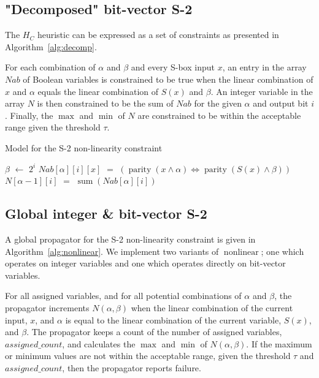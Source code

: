 \documentclass[a4paper,10pt,twoside,openright]{book}
\newcommand{\N}{N(\alpha,\beta)}
\newcommand*\Let[2]{\State #1 $\gets$ #2}
\newcommand*\Equivalent[2]{\State #1 $=$ #2}
\DeclareMathOperator{\parity}{parity}
\DeclareMathOperator{\funcsum}{sum}
\DeclareMathOperator{\nonlinear}{nonlinear}
\begin{document}
\subsection{"Decomposed" bit-vector S-2}
The $H_C$ heuristic can be expressed as a set of constraints as presented in Algorithm~\ref{alg:decomp}. 

For each combination of $\alpha$ and $\beta$
and every S-box input $x$,
an entry in the array $\mathit{Nab}$ of Boolean variables is constrained
to be true when the linear combination of $x$ and $\alpha$
equals the linear combination of $S(x)$ and $\beta$.
An integer variable in the array $N$ is then constrained to be the 
sum of $\mathit{Nab}$ for the given $\alpha$ and output bit $i$.
Finally, the $\max$ and $\min$ of $N$ are constrained to be within the 
acceptable range given the threshold $\tau$.
\begin{algorithm}
    \caption{Model for the S-2 non-linearity constraint}
    \label{alg:decomp}
    \begin{algorithmic}
                \Let{$\beta$}{$2^i$}
                    \Equivalent{$\mathit{Nab}[\alpha][i][x]$}{$(\parity(x \land \alpha) \Leftrightarrow \parity(S(x) \land \beta))$}
                \EndFor
                \Equivalent{$N[\alpha-1][i]$}{$\funcsum(Nab[\alpha][i])$}
            \EndFor
        \EndFor
    \end{algorithmic}
\end{algorithm}

\subsection{Global integer \& bit-vector S-2}
\label{sec:globalstwo}
A global propagator for the S-2 non-linearity constraint is given in Algorithm~\ref{alg:nonlinear}. 
We implement two variants of $\nonlinear$; one which operates
on integer variables and one which operates directly on bit-vector variables.

For all assigned variables, and for all potential combinations of $\alpha$ and $\beta$, 
the propagator increments $\N$ when the linear combination of the 
current input, $x$, and $\alpha$ is equal to the linear combination 
of the current variable, $S(x)$, and $\beta$.
The propagator keeps a count of the number of assigned variables, $\mathit{assigned\_count}$, and
calculates the $\max$ and $\min$ of $\N$. 
If the maximum or minimum values are not within the acceptable range, given the threshold $\tau$
and $\mathit{assigned\_count}$,
then the propagator reports failure.
\end{document}

